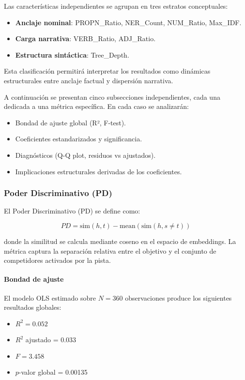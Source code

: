 \documentclass[../main.tex]{subfiles}
\begin{document}
Las características independientes se agrupan en tres estratos conceptuales:

\begin{itemize}
\item \textbf{Anclaje nominal}: PROPN\_Ratio, NER\_Count, NUM\_Ratio, Max\_IDF.
\item \textbf{Carga narrativa}: VERB\_Ratio, ADJ\_Ratio.
\item \textbf{Estructura sintáctica}: Tree\_Depth.
\end{itemize}

Esta clasificación permitirá interpretar los resultados como dinámicas estructurales entre anclaje factual y dispersión narrativa.

A continuación se presentan cinco subsecciones independientes, cada una dedicada a una métrica específica. En cada caso se analizarán:

\begin{itemize}
\item Bondad de ajuste global (R², F-test).
\item Coeficientes estandarizados y significancia.
\item Diagnósticos (Q-Q plot, residuos vs ajustados).
\item Implicaciones estructurales derivadas de los coeficientes.
\end{itemize}

\subsubsection{Poder Discriminativo (PD)}

El Poder Discriminativo (PD) se define como:

\[
PD = \text{sim}(h,t) - \text{mean}(\text{sim}(h, s \neq t))
\]

donde la similitud se calcula mediante coseno en el espacio de embeddings. La métrica captura la separación relativa entre el objetivo y el conjunto de competidores activados por la pista.

\paragraph{Bondad de ajuste}

El modelo OLS estimado sobre $N = 360$ observaciones produce los siguientes resultados globales:

\begin{itemize}
\item $R^2 = 0.052$
\item $R^2$ ajustado = 0.033
\item $F = 3.458$
\item $p$-valor global = 0.00135
\end{itemize}
\end{document}
